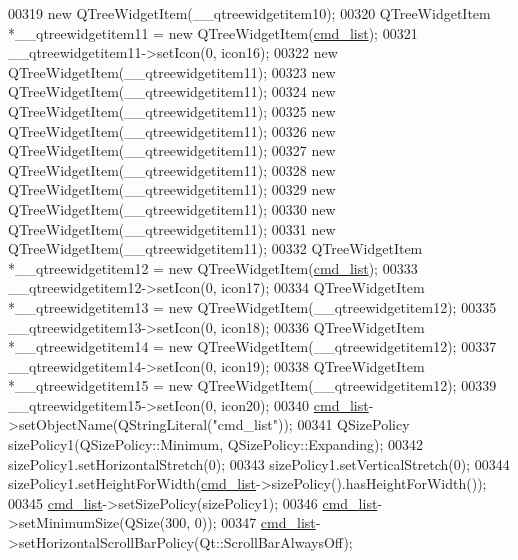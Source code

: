 \begin{DoxyCode}
00319         \textcolor{keyword}{new} QTreeWidgetItem(\_\_qtreewidgetitem10);
00320         QTreeWidgetItem *\_\_qtreewidgetitem11 = \textcolor{keyword}{new} QTreeWidgetItem(\hyperlink{a00027_aa66ece71395b435e915d384fb63bac1d}{cmd\_list});
00321         \_\_qtreewidgetitem11->setIcon(0, icon16);
00322         \textcolor{keyword}{new} QTreeWidgetItem(\_\_qtreewidgetitem11);
00323         \textcolor{keyword}{new} QTreeWidgetItem(\_\_qtreewidgetitem11);
00324         \textcolor{keyword}{new} QTreeWidgetItem(\_\_qtreewidgetitem11);
00325         \textcolor{keyword}{new} QTreeWidgetItem(\_\_qtreewidgetitem11);
00326         \textcolor{keyword}{new} QTreeWidgetItem(\_\_qtreewidgetitem11);
00327         \textcolor{keyword}{new} QTreeWidgetItem(\_\_qtreewidgetitem11);
00328         \textcolor{keyword}{new} QTreeWidgetItem(\_\_qtreewidgetitem11);
00329         \textcolor{keyword}{new} QTreeWidgetItem(\_\_qtreewidgetitem11);
00330         \textcolor{keyword}{new} QTreeWidgetItem(\_\_qtreewidgetitem11);
00331         \textcolor{keyword}{new} QTreeWidgetItem(\_\_qtreewidgetitem11);
00332         QTreeWidgetItem *\_\_qtreewidgetitem12 = \textcolor{keyword}{new} QTreeWidgetItem(\hyperlink{a00027_aa66ece71395b435e915d384fb63bac1d}{cmd\_list});
00333         \_\_qtreewidgetitem12->setIcon(0, icon17);
00334         QTreeWidgetItem *\_\_qtreewidgetitem13 = \textcolor{keyword}{new} QTreeWidgetItem(\_\_qtreewidgetitem12);
00335         \_\_qtreewidgetitem13->setIcon(0, icon18);
00336         QTreeWidgetItem *\_\_qtreewidgetitem14 = \textcolor{keyword}{new} QTreeWidgetItem(\_\_qtreewidgetitem12);
00337         \_\_qtreewidgetitem14->setIcon(0, icon19);
00338         QTreeWidgetItem *\_\_qtreewidgetitem15 = \textcolor{keyword}{new} QTreeWidgetItem(\_\_qtreewidgetitem12);
00339         \_\_qtreewidgetitem15->setIcon(0, icon20);
00340         \hyperlink{a00027_aa66ece71395b435e915d384fb63bac1d}{cmd\_list}->setObjectName(QStringLiteral(\textcolor{stringliteral}{"cmd\_list"}));
00341         QSizePolicy sizePolicy1(QSizePolicy::Minimum, QSizePolicy::Expanding);
00342         sizePolicy1.setHorizontalStretch(0);
00343         sizePolicy1.setVerticalStretch(0);
00344         sizePolicy1.setHeightForWidth(\hyperlink{a00027_aa66ece71395b435e915d384fb63bac1d}{cmd\_list}->sizePolicy().hasHeightForWidth());
00345         \hyperlink{a00027_aa66ece71395b435e915d384fb63bac1d}{cmd\_list}->setSizePolicy(sizePolicy1);
00346         \hyperlink{a00027_aa66ece71395b435e915d384fb63bac1d}{cmd\_list}->setMinimumSize(QSize(300, 0));
00347         \hyperlink{a00027_aa66ece71395b435e915d384fb63bac1d}{cmd\_list}->setHorizontalScrollBarPolicy(Qt::ScrollBarAlwaysOff);

\end{DoxyCode}
